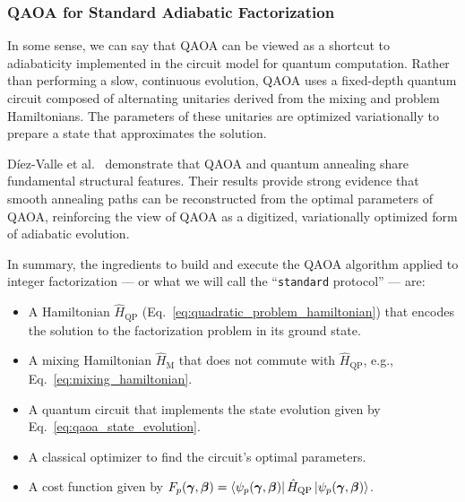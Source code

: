 \subsubsection{QAOA for Standard Adiabatic Factorization}
In some sense, we can say that QAOA can be viewed as a shortcut to adiabaticity implemented in the circuit model for quantum computation. Rather than performing a slow, continuous evolution, QAOA uses a fixed-depth quantum circuit composed of alternating unitaries derived from the mixing and problem Hamiltonians. The parameters of these unitaries are optimized variationally to prepare a state that approximates the solution.

Díez-Valle et al.~\cite{diez-valle_universal_2025} demonstrate that QAOA and quantum annealing share fundamental structural features. Their results provide strong evidence that smooth annealing paths can be reconstructed from the optimal parameters of QAOA, reinforcing the view of QAOA as a digitized, variationally optimized form of adiabatic evolution.

In summary, the ingredients to build and execute the QAOA algorithm applied to integer factorization --- or what we will call the ``\texttt{standard} protocol'' --- are:
\begin{itemize}
    \item A Hamiltonian $\hat{H}_\mathrm{QP}$ (Eq.~\ref{eq:quadratic_problem_hamiltonian}) that encodes the solution to the factorization problem in its ground state.
    \item A mixing Hamiltonian $\hat{H}_\mathrm{M}$ that does not commute with $\hat{H}_\mathrm{QP}$, e.g., Eq.~\ref{eq:mixing_hamiltonian}.
    \item A quantum circuit that implements the state evolution given by Eq.~\ref{eq:qaoa_state_evolution}.
    \item A classical optimizer to find the circuit's optimal parameters.
    \item A cost function given by $F_p (\bm{\gamma}, \bm{\beta}) = \bra{\psi_p (\bm{\gamma}, \bm{\beta})} \hat{H}_\mathrm{QP} \ket{\psi_p (\bm{\gamma}, \bm{\beta})}$.
\end{itemize}

